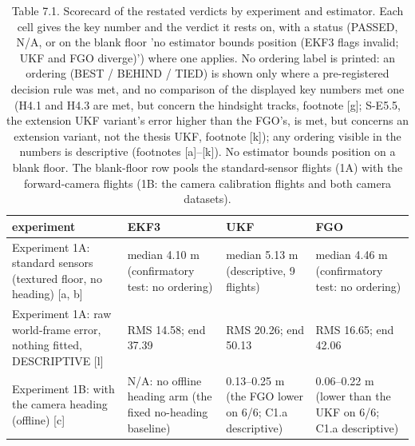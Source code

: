 \begin{table}[htbp]
\centering
\footnotesize
\caption{Table 7.1. Scorecard of the restated verdicts by experiment and estimator. Each cell gives the key number and the verdict it rests on, with a status (PASSED, N/A, or on the blank floor 'no estimator bounds position (EKF3 flags invalid; UKF and FGO diverge)') where one applies. No ordering label is printed: an ordering (BEST / BEHIND / TIED) is shown only where a pre-registered decision rule was met, and no comparison of the displayed key numbers met one (H4.1 and H4.3 are met, but concern the hindsight tracks, footnote [g]; S-E5.5, the extension UKF variant's error higher than the FGO's, is met, but concerns an extension variant, not the thesis UKF, footnote [k]); any ordering visible in the numbers is descriptive (footnotes [a]--[k]). No estimator bounds position on a blank floor. The blank-floor row pools the standard-sensor flights (1A) with the forward-camera flights (1B: the camera calibration flights and both camera datasets).}
\label{tab:7-1}
\begin{tabular}{p{}p{}p{}p{}}
\toprule
\textbf{experiment} & \textbf{EKF3} & \textbf{UKF} & \textbf{FGO} \\
\midrule
Experiment 1A: standard sensors (textured floor, no heading) [a, b] & median 4.10 m (confirmatory test: no ordering) & median 5.13 m (descriptive, 9 flights) & median 4.46 m (confirmatory test: no ordering) \\
Experiment 1A: raw world-frame error, nothing fitted, DESCRIPTIVE [l] & RMS 14.58; end 37.39 & RMS 20.26; end 50.13 & RMS 16.65; end 42.06 \\
Experiment 1B: with the camera heading (offline) [c] & N/A: no offline heading arm (the fixed no-heading baseline) & 0.13--0.25 m (the FGO lower on 6/6; C1.a descriptive) & 0.06--0.22 m (lower than the UKF on 6/6; C1.a descriptive) \\

\end{tabular}
\end{table}

